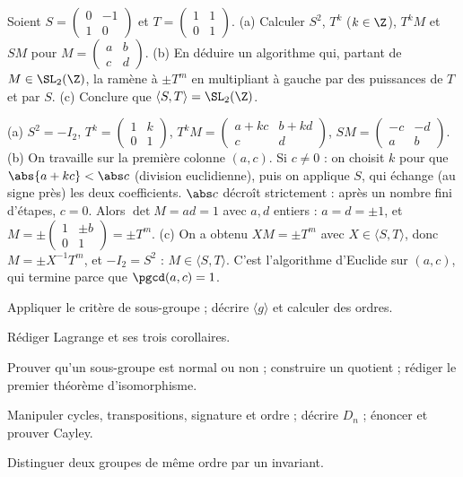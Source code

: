 \begin{exo}\label{exo-sl2z}
Soient $S=\begin{pmatrix}0&-1\\1&0\end{pmatrix}$ et $T=\begin{pmatrix}1&1\\0&1\end{pmatrix}$. (a) Calculer $S^2$, $T^k$ ($k\in\Z$), $T^kM$ et $SM$ pour $M=\begin{pmatrix}a&b\\c&d\end{pmatrix}$. (b) En déduire un algorithme qui, partant de $M\in\SL_2(\Z)$, la ramène à $\pm T^m$ en multipliant à gauche par des puissances de $T$ et par $S$. (c) Conclure que $\langle S,T\rangle=\SL_2(\Z)$.
\begin{corrige}
(a) $S^2=-I_2$, $T^k=\begin{pmatrix}1&k\\0&1\end{pmatrix}$, $T^kM=\begin{pmatrix}a+kc&b+kd\\c&d\end{pmatrix}$, $SM=\begin{pmatrix}-c&-d\\a&b\end{pmatrix}$.
(b) On travaille sur la première colonne $(a,c)$. Si $c\neq0$ : on choisit $k$ pour que $\abs{a+kc}<\abs c$ (division euclidienne), puis on applique $S$, qui échange (au signe près) les deux coefficients. $\abs c$ décroît strictement : après un nombre fini d'étapes, $c=0$. Alors $\det M=ad=1$ avec $a,d$ entiers : $a=d=\pm1$, et $M=\pm\begin{pmatrix}1&\pm b\\0&1\end{pmatrix}=\pm T^m$.
(c) On a obtenu $XM=\pm T^m$ avec $X\in\langle S,T\rangle$, donc $M=\pm X^{-1}T^m$, et $-I_2=S^2$ : $M\in\langle S,T\rangle$. C'est l'algorithme d'Euclide sur $(a,c)$, qui termine parce que $\pgcd(a,c)=1$.
\end{corrige}
\end{exo}

\begin{bilan}
\item Appliquer le critère de sous-groupe ; décrire $\langle g\rangle$ et calculer des ordres.
\item Rédiger Lagrange et ses trois corollaires.
\item Prouver qu'un sous-groupe est normal ou non ; construire un quotient ; rédiger le premier théorème d'isomorphisme.
\item Manipuler cycles, transpositions, signature et ordre ; décrire $D_n$ ; énoncer et prouver Cayley.
\item Distinguer deux groupes de même ordre par un invariant.
\end{bilan}
